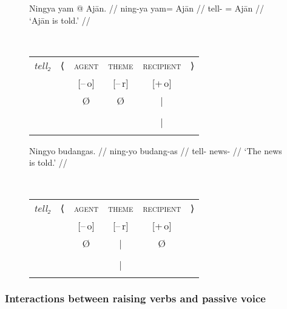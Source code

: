 \begin{figure}
\pex\label{ex:intrnzn_pass}
\a\label{ex:intrnzn_pass_1}%
\ljudge*\begin{minipage}[t]{.4\remaining}
\begingl
	\gla Ningya yam @ Ajān. //
	\glb ning-ya yam= Ajān //
	\glc tell-\TsgF{} \Dat{}= Ajān //
	\glft `Ajān is told.' //
\endgl
\end{minipage}
~
\begin{tabular}[t]{>{\itshape}l l c c c r}
tell₂
	& ⟨
	& \textsc{agent}
	& \textsc{theme}
	& \textsc{recipient}
	& ⟩
	\\
%
	& %
	& [–\,o]
	& [–\,r]
	& [+\,o]
	& %
	\\

%
	& %
	& Ø
	& Ø
	& |
	& %
	\\

%
	& %
	& %
	& %
	& \Subj
	& %
	\\

%
	& %
	& %
	& %
	& |
	& %
	\\

%
	& %
	& %
	& %
	& \fw{Ajān}
	& %
	\\
\end{tabular}

\a\label{ex:intrnzn_pass_2}%
\begin{minipage}[t]{.4\remaining}
\begingl
	\gla Ningyo budangas. //
	\glb ning-yo budang-as //
	\glc tell-\TsgN{} news-\Parg{} //
	\glft `The news is told.' //
\endgl
\end{minipage}
~
\begin{tabular}[t]{>{\itshape}l l c c c r}
tell₂
	& ⟨
	& \textsc{agent}
	& \textsc{theme}
	& \textsc{recipient}
	& ⟩
	\\
%
	& %
	& [–\,o]
	& [–\,r]
	& [+\,o]
	& %
	\\

%
	& %
	& Ø
	& |
	& Ø
	& %
	\\

%
	& %
	& %
	& \Subj
	& %
	& %
	\\

%
	& %
	& %
	& |
	& %
	& %
	\\

%
	& %
	& %
	& \fw{news}
	& %
	& %
	\\
\end{tabular}

\xe
\end{figure}


\subsubsection{Interactions between raising verbs and passive voice}

